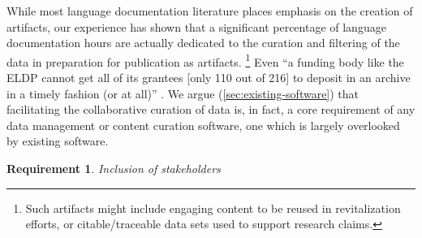 \documentclass[11pt]{article}
\newtheorem{requirement}{Requirement}
\begin{document}
While most language documentation literature places emphasis on the creation of
artifacts, our experience has shown that a significant percentage of language
documentation hours are actually dedicated to the curation and filtering of the
data in preparation for publication as artifacts.%
\footnote{Such artifacts might include engaging content to be reused in
    revitalization efforts, or citable/traceable data sets used to support
research claims.}
Even ``a funding body like the ELDP cannot get all of its grantees [only 110
out of 216] to deposit in an archive in a timely fashion (or at all)''
\cite{Thieberger:2012}. We argue (\autoref{sec:existing-software}) that
facilitating the collaborative curation of data is, in fact, a core requirement
of any data management or content curation software, one which is largely
overlooked by existing software.


 
 

\begin{requirement}
	\label{req:inclusive}
       Inclusion of stakeholders
\end{requirement}
\end{document}
